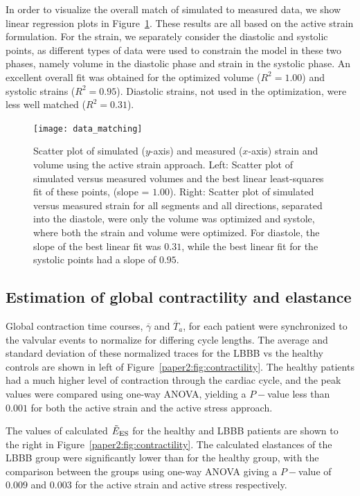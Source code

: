In order to visualize the overall match of simulated to measured data,
we show linear regression plots in
Figure~\ref{paper2:fig:data_matching}. These results are all based on the
active strain formulation. For
the strain, we separately consider the diastolic and systolic points,
as different types of data were used to  constrain the model in these
two phases, namely volume in the diastolic phase and strain in the
systolic phase. An excellent overall fit was obtained for the optimized
volume ($R^2=1.00$) and systolic strains ($R^2=0.95$). 
Diastolic strains, not used in the optimization, were less well
matched ($R^2=0.31$).



\begin{figure}[htbp]
  \centering
  \texttt{[image: data\_matching]}
  \caption{Scatter plot of simulated ($y$-axis) and measured
    ($x$-axis) strain and volume using the active
    strain approach. Left: Scatter plot of simulated versus
    measured volumes and the best linear least-squares fit of these
    points, (slope = $1.00$). Right: Scatter plot of simulated versus
    measured strain for all segments and all directions, separated
    into the diastole, were only the volume was optimized and systole,
    where both the strain and volume were optimized. For diastole, the slope of
    the best linear fit was $0.31$, while the best linear fit for the
    systolic points had a slope of $0.95$.}
  \label{paper2:fig:data_matching}
\end{figure}


\subsection{Estimation of global contractility and elastance}

Global contraction time courses, $\overline{\gamma}$ and
  $\overline{T}_a$, for each patient were synchronized to the valvular
events to normalize for differing cycle lengths. The average 
and standard deviation of these normalized traces for the
LBBB vs the healthy controls are shown in left of
Figure~\ref{paper2:fig:contractility}. The healthy patients had a much higher
level of contraction through the cardiac cycle, and the peak values
were compared using one-way ANOVA, yielding a $P-$value less than
$0.001$ for both the active strain and the active stress approach. 

The values of calculated $\tilde{E}_{\text{ES}}$ for the healthy and LBBB patients are
shown to the right in Figure~\ref{paper2:fig:contractility}. The calculated
elastances of the LBBB group were significantly lower than for the healthy
group, with the comparison between the groups using one-way ANOVA
giving a $P-$value of $0.009$ and $0.003$ for the active strain and
active stress respectively.




